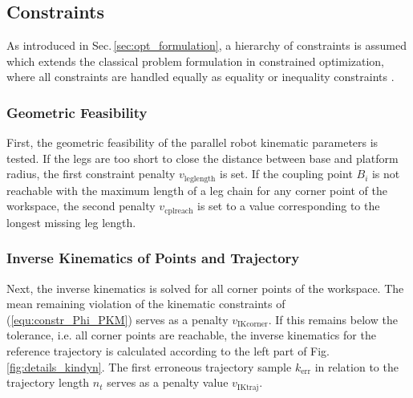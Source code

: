 \documentclass[fleqn,a4paper,10pt]{article}
\newcommand{\bm}[1]{\mathbf{#1}}
\begin{document}
\begin{multicols}{2}


\subsection{Constraints}
\label{sec:opt_constraints}

As introduced in Sec.\,\ref{sec:opt_formulation}, a hierarchy of constraints is assumed \cite{Ramirez2018} which extends the classical problem formulation in constrained optimization, where all constraints are handled equally as equality or inequality constraints \cite{Jordehi2015}.

\subsubsection{Geometric Feasibility}

First, the geometric feasibility of the parallel robot kinematic parameters is tested.
If the legs are too short to close the distance between base and platform radius, the first constraint penalty $v_\mathrm{leglength}$ is set.
If the coupling point $B_i$ is not reachable with the maximum length of a leg chain for any corner point of the workspace, the second penalty $v_\mathrm{cplreach}$ is set to a value corresponding to the longest missing leg length.

\subsubsection{Inverse Kinematics of Points and Trajectory}

Next, the inverse kinematics is solved for all corner points of the workspace.
The mean remaining violation of the kinematic constraints of (\ref{equ:constr_Phi_PKM}) serves as a penalty $v_\mathrm{IKcorner}$.
If this remains below the tolerance, i.e. all corner points are reachable, the inverse kinematics for the reference trajectory is calculated according to the left part of Fig.\,\ref{fig:details_kindyn}.
The first erroneous trajectory sample $k_{\mathrm{err}}$ in relation to the trajectory length $n_t$ serves as a penalty value $v_\mathrm{IKtraj}$.


\end{multicols}
\end{document}
